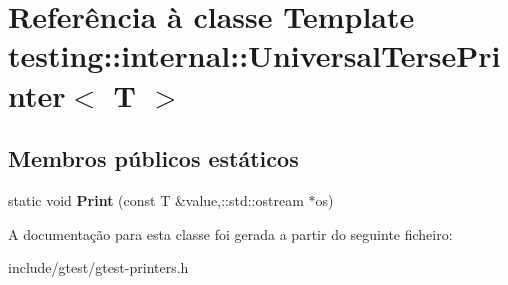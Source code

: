 \hypertarget{classtesting_1_1internal_1_1UniversalTersePrinter}{\section{Referência à classe Template testing\-:\-:internal\-:\-:Universal\-Terse\-Printer$<$ T $>$}
\label{classtesting_1_1internal_1_1UniversalTersePrinter}
}
\subsection*{Membros públicos estáticos}
\begin{DoxyCompactItemize}
\item 
\hypertarget{classtesting_1_1internal_1_1UniversalTersePrinter_a2e16ee42c9b18fca397cd95f32e8e879}{static void {\bfseries Print} (const T \&value,\-::std\-::ostream $\ast$os)}\label{classtesting_1_1internal_1_1UniversalTersePrinter_a2e16ee42c9b18fca397cd95f32e8e879}

\end{DoxyCompactItemize}


A documentação para esta classe foi gerada a partir do seguinte ficheiro\-:\begin{DoxyCompactItemize}
\item 
include/gtest/gtest-\/printers.\-h\end{DoxyCompactItemize}
